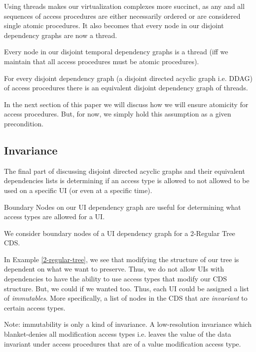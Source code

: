 Using threads makes our virtualization complexes more succinct, as any and all sequences of access procedures are either necessarily ordered or are considered single atomic procedures. It also becomes that every node in our disjoint dependency graphs are now a thread.

\begin{props}
	\label{nodes-are-threads}
	Every node in our disjoint temporal dependency graphs is a thread (iff we maintain that all access procedures must be atomic procedures).
\end{props}

\begin{con-cor}
	\label{thread-ddag}
	For every disjoint dependency graph (a disjoint directed acyclic graph i.e. DDAG) of access procedures there is an equivalent disjoint dependency graph of threads.
\end{con-cor}

In the next section of this paper we will discuss how we will ensure atomicity for access procedures. But, for now, we simply hold this assumption as a given precondition.

\subsection{Invariance}

The final part of discussing disjoint directed acyclic graphs and their equivalent dependencies lists is determining if an access type is allowed to not allowed to be used on a specific UI (or even at a specific time).

Boundary Nodes on our UI dependency graph are useful for determining what access types are allowed for a UI.

\begin{con-def}[Boundaries]
	\label{boundaries}
\end{con-def}

\begin{con-ex} 
	\label{2-regular-tree}

	We consider boundary nodes of a UI dependency graph for a 2-Regular Tree CDS.

\end{con-ex}

In Example \ref{2-regular-tree}, we see that modifying the structure of our tree is dependent on what we want to preserve. Thus, we do not allow UIs with dependencies to have the ability to use access types that modify our CDS structure. But, we could if we wanted too. Thus, each UI could be assigned a list of \textit{immutables}. More specifically, a list of nodes in the CDS that are \textit{invariant} to certain access types.

Note: immutability is only a kind of invariance. A low-resolution invariance which blanket-denies all modification access types i.e. leaves the value of the data invariant under access procedures that are of a value modification access type.




